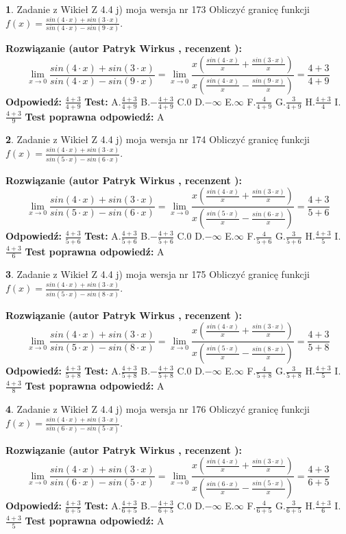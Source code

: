 \documentclass[12pt, a4paper]{article}
\theoremstyle{definition} %
\newtheorem{zad}{}
\newcommand{\zadStart}[1]{\begin{zad}#1\newline}
\newcommand{\zadStop}{\end{zad}}
\newcommand{\rozwStart}[2]{\noindent \textbf{Rozwiązanie (autor #1 , recenzent #2): }\newline}
\newcommand{\rozwStop}{\newline}
\newcommand{\odpStart}{\noindent \textbf{Odpowiedź:}\newline}
\newcommand{\odpStop}{\newline}
\newcommand{\testStart}{\noindent \textbf{Test:}\newline}
\newcommand{\testStop}{\newline}
\newcommand{\kluczStart}{\noindent \textbf{Test poprawna odpowiedź:}\newline}
\newcommand{\kluczStop}{\newline}
\begin{document}
\zadStart{Zadanie z Wikieł Z 4.4 j) moja wersja nr 173}
Obliczyć granicę funkcji $f(x)=\frac{sin(4\cdot x) +sin(3\cdot x)}{sin(4\cdot x) -sin(9\cdot x)}$.
\zadStop
\rozwStart{Patryk Wirkus}{}
$$\lim\limits_{x\to 0}\frac{sin(4\cdot x) +sin(3\cdot x)}{sin(4\cdot x) -sin(9\cdot x)}=\lim\limits_{x\to 0}\frac{x(\frac{sin(4\cdot x)}{x}+\frac{sin(3\cdot x)}{x})}{x(\frac{sin(4\cdot x)}{x}-\frac{sin(9\cdot x)}{x})}=\frac{4+3}{4+9}$$
\rozwStop
\odpStart
$\frac{4+3}{4+9}$
\odpStop
\testStart
A.$\frac{4+3}{4+9}$
B.$-\frac{4+3}{4+9}$
C.$0$
D.$-\infty$
E.$\infty$
F.$\frac{4}{4+9}$
G.$\frac{3}{4+9}$
H.$\frac{4+3}{4}$
I.$\frac{4+3}{9}$
\testStop
\kluczStart
A
\kluczStop



\zadStart{Zadanie z Wikieł Z 4.4 j) moja wersja nr 174}
Obliczyć granicę funkcji $f(x)=\frac{sin(4\cdot x) +sin(3\cdot x)}{sin(5\cdot x) -sin(6\cdot x)}$.
\zadStop
\rozwStart{Patryk Wirkus}{}
$$\lim\limits_{x\to 0}\frac{sin(4\cdot x) +sin(3\cdot x)}{sin(5\cdot x) -sin(6\cdot x)}=\lim\limits_{x\to 0}\frac{x(\frac{sin(4\cdot x)}{x}+\frac{sin(3\cdot x)}{x})}{x(\frac{sin(5\cdot x)}{x}-\frac{sin(6\cdot x)}{x})}=\frac{4+3}{5+6}$$
\rozwStop
\odpStart
$\frac{4+3}{5+6}$
\odpStop
\testStart
A.$\frac{4+3}{5+6}$
B.$-\frac{4+3}{5+6}$
C.$0$
D.$-\infty$
E.$\infty$
F.$\frac{4}{5+6}$
G.$\frac{3}{5+6}$
H.$\frac{4+3}{5}$
I.$\frac{4+3}{6}$
\testStop
\kluczStart
A
\kluczStop



\zadStart{Zadanie z Wikieł Z 4.4 j) moja wersja nr 175}
Obliczyć granicę funkcji $f(x)=\frac{sin(4\cdot x) +sin(3\cdot x)}{sin(5\cdot x) -sin(8\cdot x)}$.
\zadStop
\rozwStart{Patryk Wirkus}{}
$$\lim\limits_{x\to 0}\frac{sin(4\cdot x) +sin(3\cdot x)}{sin(5\cdot x) -sin(8\cdot x)}=\lim\limits_{x\to 0}\frac{x(\frac{sin(4\cdot x)}{x}+\frac{sin(3\cdot x)}{x})}{x(\frac{sin(5\cdot x)}{x}-\frac{sin(8\cdot x)}{x})}=\frac{4+3}{5+8}$$
\rozwStop
\odpStart
$\frac{4+3}{5+8}$
\odpStop
\testStart
A.$\frac{4+3}{5+8}$
B.$-\frac{4+3}{5+8}$
C.$0$
D.$-\infty$
E.$\infty$
F.$\frac{4}{5+8}$
G.$\frac{3}{5+8}$
H.$\frac{4+3}{5}$
I.$\frac{4+3}{8}$
\testStop
\kluczStart
A
\kluczStop



\zadStart{Zadanie z Wikieł Z 4.4 j) moja wersja nr 176}
Obliczyć granicę funkcji $f(x)=\frac{sin(4\cdot x) +sin(3\cdot x)}{sin(6\cdot x) -sin(5\cdot x)}$.
\zadStop
\rozwStart{Patryk Wirkus}{}
$$\lim\limits_{x\to 0}\frac{sin(4\cdot x) +sin(3\cdot x)}{sin(6\cdot x) -sin(5\cdot x)}=\lim\limits_{x\to 0}\frac{x(\frac{sin(4\cdot x)}{x}+\frac{sin(3\cdot x)}{x})}{x(\frac{sin(6\cdot x)}{x}-\frac{sin(5\cdot x)}{x})}=\frac{4+3}{6+5}$$
\rozwStop
\odpStart
$\frac{4+3}{6+5}$
\odpStop
\testStart
A.$\frac{4+3}{6+5}$
B.$-\frac{4+3}{6+5}$
C.$0$
D.$-\infty$
E.$\infty$
F.$\frac{4}{6+5}$
G.$\frac{3}{6+5}$
H.$\frac{4+3}{6}$
I.$\frac{4+3}{5}$
\testStop
\kluczStart
A
\kluczStop
\end{document}
